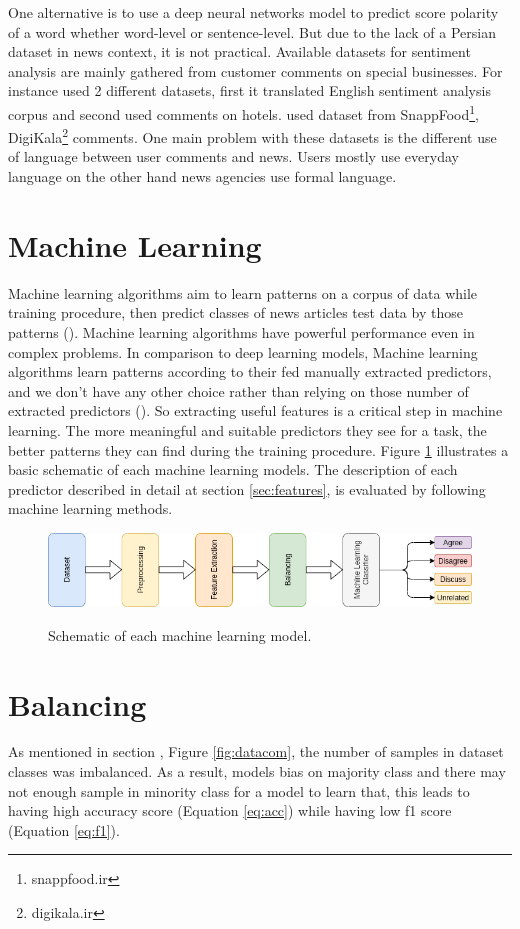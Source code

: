 \bigbreak
One alternative is to use a deep neural networks model to predict score polarity of a word whether word-level or sentence-level. But due to the lack of a Persian dataset in news context, it is not practical. Available datasets for sentiment analysis are mainly gathered from customer comments on special businesses. For instance \cite{polar_hotel} used 2 different datasets, first it translated English sentiment analysis corpus and second used comments on hotels. \cite{polar_servic} used dataset from SnappFood\footnote{snappfood.ir}, DigiKala\footnote{digikala.ir} comments. One main problem with these datasets is the different use of language between user comments and news. Users mostly use everyday language on the other hand news agencies use formal language.

\section{Machine Learning}
Machine learning algorithms aim to learn patterns on a corpus of data while training procedure, then predict classes of news articles test data by those patterns (\cite{book_fake}). Machine learning algorithms have powerful performance even in complex problems. In comparison to deep learning models, Machine learning algorithms learn patterns according to their fed manually extracted predictors, and we don't have any other choice rather than relying on those number of extracted predictors (\cite{book_fake}). So extracting useful features  is a critical step in machine learning. The more meaningful and suitable predictors they see for a task, the better patterns they can find during the training procedure. Figure \ref{fig:mlschm} illustrates a basic schematic of each machine learning models. The description of each predictor described in detail at section \ref{sec:features}, is evaluated by following machine learning methods.   

\begin{figure}%
	\centering
	{\includegraphics[width=14.5cm]{statistics/schema/ml.png} }
	\caption{Schematic of each machine learning model.}%
	\label{fig:mlschm}%
\end{figure}

\section{Balancing}
As mentioned in section , Figure \ref{fig:datacom}, the number of samples in dataset classes was imbalanced. As a result, models bias on majority class and there may not enough sample in minority class for a model to learn that, this leads to having high accuracy score (Equation \ref{eq:acc}) while having low f1 score (Equation \ref{eq:f1}).  

